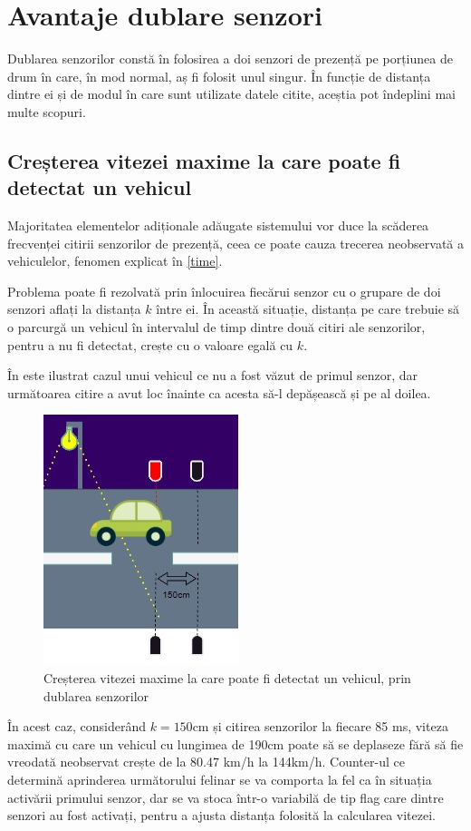 \section{Avantaje dublare senzori}
Dublarea senzorilor constă în folosirea a doi senzori de prezență pe porțiunea de drum în care, în mod normal, aș fi folosit unul singur. În funcție de distanța dintre ei și de modul în care sunt utilizate datele citite, aceștia pot îndeplini mai multe scopuri. 

\subsection{Creșterea vitezei maxime la care poate fi detectat un vehicul} \label{speed}
Majoritatea elementelor adiționale adăugate sistemului vor duce la scăderea frecvenței citirii senzorilor de prezență, ceea ce poate cauza trecerea neobservată a vehiculelor, fenomen explicat în \autoref{time}. 

Problema poate fi rezolvată prin înlocuirea fiecărui senzor cu o grupare de doi senzori aflați la distanța $k$ între ei. În această situație, distanța pe care trebuie să o parcurgă un vehicul în intervalul de timp dintre două citiri ale senzorilor, pentru a nu fi detectat, crește cu o valoare egală cu $k$.

În  este ilustrat cazul unui vehicul ce nu a fost văzut de primul senzor, dar următoarea citire a avut loc înainte ca acesta să-l depășească și pe al doilea.
\begin{figure}[!ht]
    \begin{center}
    \includegraphics[width=0.3\linewidth,keepaspectratio]{pics/double.jpg}
    \end{center}
    \caption{Creșterea vitezei maxime la care poate fi detectat un vehicul, prin dublarea senzorilor}
    \label{fig:double}
\end{figure}
În acest caz, considerând $k=150$cm și citirea senzorilor la fiecare 85 ms, viteza maximă cu care un vehicul cu lungimea de 190cm poate să se deplaseze fără să fie vreodată neobservat crește de la 80.47 km/h la 144km/h. Counter-ul ce determină aprinderea următorului felinar se va comporta la fel ca în situația activării primului senzor, dar se va stoca într-o variabilă de tip flag care dintre senzori au fost activați, pentru a ajusta distanța folosită la calcularea vitezei.

